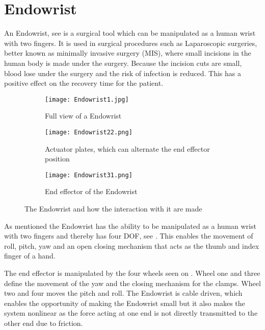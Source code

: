 \section{Endowrist}\label{sec:Endowrist}

An Endowrist, see  is a surgical tool which can be manipulated as a human wrist with two fingers. It is used in surgical procedures such as Laparoscopic surgeries, better known as minimally invasive surgery (MIS), where small incisions in the human body is made under the surgery. Because the incision cuts are small, blood lose under the surgery and the risk of infection is reduced. This has a positive effect on the recovery time for the patient.


\begin{figure}[H]
	\centering
	\begin{subfigure}{.32\textwidth}
		\centering
		\texttt{[image: Endowrist1.jpg]}
		\caption{Full view of a Endowrist\vspace{8.5mm}   }
		\label{fig:Endo_full}
	\end{subfigure}
	\begin{subfigure}{.32\textwidth}
		\centering
		\texttt{[image: Endowrist22.png]}
		\caption{Actuator plates, which can alternate the end effector position}
		\label{fig:Endo_plates}
	\end{subfigure}
	\begin{subfigure}{.32\textwidth}
		\centering
		\texttt{[image: Endowrist31.png]}
		\caption{End effector of the Endowrist\newline}
		\label{fig:Endo_end}
	\end{subfigure}
\caption{The Endowrist and how the interaction with it are made}
\label{fig:endowrits_set}
\end{figure}

As mentioned the Endowrist has the ability to be manipulated as a human wrist with two fingers and thereby has four \gls{DOF}, see . This enables the movement of roll, pitch, yaw and an open closing mechanism that acts as the thumb and index finger of a hand. 

The end effector is manipulated by the four wheels seen on . Wheel one and three define the movement of the yaw and the closing mechanism for the clamps. Wheel two and four moves the pitch and roll. The Endowrist is cable driven, which enables the opportunity of making the Endowrist small but it also makes the system nonlinear as the force acting at one end is not directly transmitted to the other end due to friction. 



